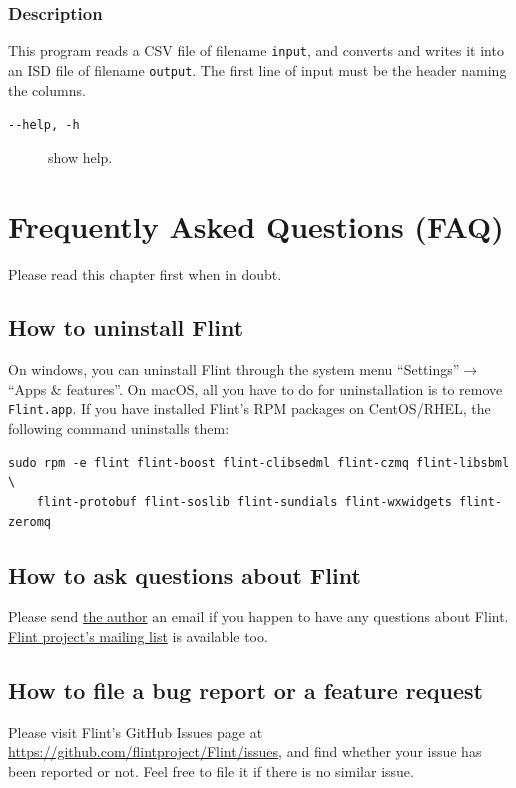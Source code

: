 \documentclass[a4paper,10pt]{report}
\begin{document}
\subsection{Description}
\label{sec:org16a0d58}
This program reads a CSV file of filename \texttt{input}, and converts and writes
it into an ISD file of filename \texttt{output}.
The first line of input must be the header naming the columns.

\begin{description}
\item[{\texttt{-{}-help, -h}}] show help.
\end{description}

\chapter{Frequently Asked Questions (FAQ)}
\label{sec:org83e183a}
Please read this chapter first when in doubt.

\section{How to uninstall Flint}
\label{sec:orga087255}
On windows, you can uninstall Flint through the system menu ``Settings''\(\to\)``Apps \& features''.
On macOS, all you have to do for uninstallation is to remove \texttt{Flint.app}.
If you have installed Flint's RPM packages on CentOS/RHEL, the following command
uninstalls them:
\begin{verbatim}
sudo rpm -e flint flint-boost flint-clibsedml flint-czmq flint-libsbml \
    flint-protobuf flint-soslib flint-sundials flint-wxwidgets flint-zeromq
\end{verbatim}

\section{How to ask questions about Flint}
\label{sec:orga401e08}
Please send \href{mailto:tabe@fixedpoint.jp}{the author} an email if you happen to have any questions about Flint.
\href{https://groups.google.com/g/flint-discuss}{Flint project's mailing list} is available too.

\section{How to file a bug report or a feature request}
\label{sec:org22266df}
Please visit Flint's GitHub Issues page at
\url{https://github.com/flintproject/Flint/issues},
and find whether your issue has been reported or not.
Feel free to file it if there is no similar issue.
\end{document}
